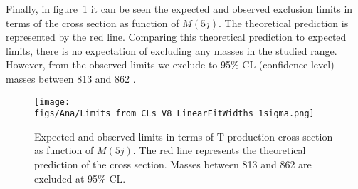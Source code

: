 Finally, in figure~\ref{fig:Lim} it can be seen the expected and observed exclusion limits in terms of the cross section as function of $M(5j)$. The theoretical prediction is represented by the red line. Comparing this theoretical prediction to expected limits, there is no expectation of excluding any masses in the studied range. However, from the observed limits we exclude to 95\% CL (confidence level) masses between 813 and 862 \GeVcc.

\begin{figure}[!Hhtbp]
  \begin{center}
    \texttt{[image: figs/Ana/Limits\_from\_CLs\_V8\_LinearFitWidths\_1sigma.png]}
    \caption{Expected and observed limits in terms of T production cross section as function of $M(5j)$. The red line represents the theoretical prediction of the cross section. Masses between 813 and 862 \GeVcc are excluded at 95\% CL.}
    \label{fig:Lim}
  \end{center}
\end{figure}
